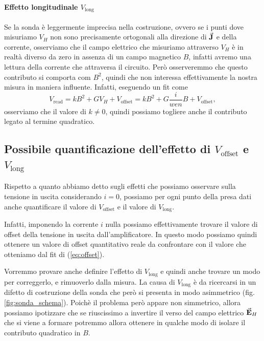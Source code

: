 \documentclass[fleqn,varvw,preprintnumbers,citeautoscript]{memo}
\newcommand\vlong{V_\text{long}}
\begin{document}
\paragraph{Effetto longitudinale $V_\text{long}$} Se la sonda è leggermente imprecisa nella costruzione, ovvero se i punti dove misuriamo $V_H$ non sono precisamente ortogonali alla direzione di $\va{J}$ e della corrente, osserviamo che il campo elettrico che misuriamo attraverso $V_H$ è in realtà diverso da zero in assenza di un campo magnetico $B$, infatti avremo una lettura della corrente che attraversa il circuito. Però osserveremmo che questo contributo si comporta com $B^2$, quindi che non interessa effettivamente la nostra misura in maniera influente. Infatti, eseguendo un fit come \begin{equation}
    V_\text{read} = kB^2 +  GV_H + V_\text{offset} = kB^2 + G\frac{i}{wen}B + V_\text{offset},\label{eq:B2_dep}
\end{equation} osserviamo che il valore di $k\neq0$, quindi possiamo togliere anche il contributo legato al termine quadratico. 

\subsection{Possibile quantificazione dell'effetto di $V_\text{offset}$ e $V_\text{long}$}

 Rispetto a quanto abbiamo detto sugli effetti che possiamo osservare sulla tensione in uscita considerando $i=0$, possiamo per ogni punto della presa dati anche quantificare il valore di $V_\text{offset}$ e il valore di $V_\text{long}$. 

Infatti, imponendo la corrente $i$ nulla possiamo effettivamente trovare il valore di offset della tensione in uscita dall'amplificatore. In questo modo possiamo quindi ottenere un valore di offset quantitativo reale da confrontare con il valore che otteniamo dal fit di (\ref{eq:offset}). 

Vorremmo provare anche definire l'effetto di $\vlong$ e quindi anche trovare un modo per correggerlo, e rimuoverlo dalla misura. La causa di $\vlong$ è da ricercarsi in un difetto di costruzione della sonda che però si presenta in modo asimmetrico (fig. \ref{fig:sonda_schema}). Poichè il problema però appare non simmetrico, allora possiamo ipotizzare che se riuscissimo a invertire il verso del campo elettrico $\va{E}_H$ che si viene a formare potremmo allora ottenere in qualche modo di isolare il contributo quadratico in $B$. 
\end{document}
